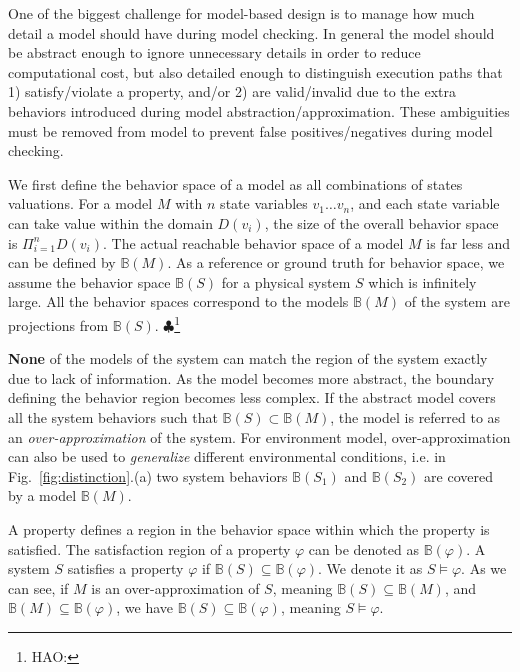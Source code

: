 \documentclass{llncs}
\newcommand{\figref}[1]{Fig.~\ref{fig:#1}}
\newcommand{\Hao}[1]{$\clubsuit$\footnote{HAO: #1}}
\begin{document}

One of the biggest challenge for model-based design is to manage how much detail a model should have during model checking. In general the model should be abstract enough to ignore unnecessary details in order to reduce computational cost, but also detailed enough to distinguish execution paths that 1) satisfy/violate a property, and/or 2) are valid/invalid due to the extra behaviors introduced during model abstraction/approximation. These ambiguities must be removed from model to prevent false positives/negatives during model checking. 

We first define the behavior space of a model as all combinations of states valuations. For a model $M$ with $n$ state variables $v_1\dots v_n$, and each state variable can take value within the domain $D(v_i)$, the size of the overall behavior space is $\Pi_{i=1}^n D(v_i)$. The actual reachable behavior space of a model $M$ is far less and can be defined by $\mathbb{B}(M)$. As a reference or ground truth for behavior space, we assume the behavior space $\mathbb{B}(S)$ for a physical system $S$ which is infinitely large. All the behavior spaces correspond to the models $\mathbb{B}(M)$ of the system are projections from $\mathbb{B}(S)$.  
\Hao{}

\textbf{None} of the models of the system can match the region of the system exactly due to lack of information. As the model becomes more abstract, the boundary defining the behavior region becomes less complex. If the abstract model covers all the system behaviors such that $\mathbb{B}(S)\subset\mathbb{B}(M)$, the model is referred to as an \emph{over-approximation} of the system. For environment model, over-approximation can also be used to \emph{generalize} different environmental conditions, i.e. in \figref{distinction}.(a) two system behaviors $\mathbb{B}(S_1)$ and $\mathbb{B}(S_2)$ are covered by a model $\mathbb{B}(M)$.

A property defines a region in the behavior space within which the property is satisfied. The satisfaction region of a property $\varphi$ can be denoted as $\mathbb{B}(\varphi)$. 
A system $S$ satisfies a property $\varphi$ if $\mathbb{B}(S)\subseteq \mathbb{B}(\varphi)$. We denote it as $S\models\varphi$. As we can see, if $M$ is an over-approximation of $S$, meaning $\mathbb{B}(S)\subseteq \mathbb{B}(M)$, and $\mathbb{B}(M)\subseteq \mathbb{B}(\varphi)$, we have $\mathbb{B}(S)\subseteq \mathbb{B}(\varphi)$, meaning $S\models\varphi$. 
\end{document}
